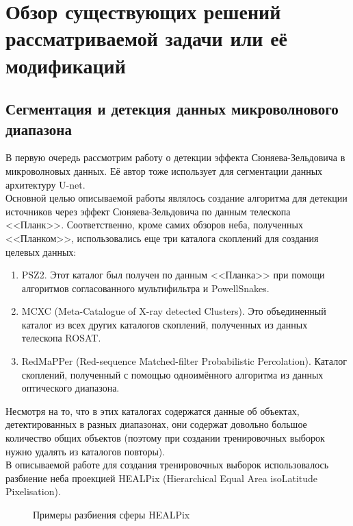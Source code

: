\chapter{Обзор существующих решений рассматриваемой задачи или её модификаций}
\label{cha:ch_2}

\section{Сегментация и детекция данных микроволнового диапазона}

В первую очередь рассмотрим работу о детекции эффекта Сюняева-Зельдовича \cite{Bonjean} в 
микроволновых данных. Её автор тоже использует для сегментации данных архитектуру U-net. \\

Основной целью описываемой работы являлось создание алгоритма для детекции источников через эффект 
Сюняева-Зельдовича по данным телескопа <<Планк>>. Соответственно, кроме самих обзоров неба, полученных 
<<Планком>>, использовались еще три каталога скоплений для создания целевых данных:

\begin{enumerate}
	\item PSZ2. Этот каталог был получен по данным <<Планка>>  при помощи алгоритмов 
	согласованного мультифильтра и PowellSnakes.
	\item MCXC (Meta-Catalogue of X-ray detected Clusters). Это объединенный каталог из всех 
	других каталогов скоплений, полученных из данных телескопа ROSAT.
	\item RedMaPPer (Red-sequence Matched-filter Probabilistic Percolation). Каталог скоплений, 
	полученный с помощью одноимённого алгоритма из данных оптического диапазона.
\end{enumerate}

Несмотря на то, что в этих каталогах содержатся данные об объектах, детектированных в разных 
диапазонах, они содержат довольно большое количество общих объектов (поэтому при создании 
тренировочных выборок нужно удалять из каталогов повторы). \\

В описываемой работе для создания тренировочных выборок использовалось разбиение неба проекцией 
HEALPix (Hierarchical Equal Area isoLatitude Pixelisation). \\
\begin{figure}[h]
	\caption{Примеры разбиения сферы HEALPix \cite{Healpix}}
\end{figure}

